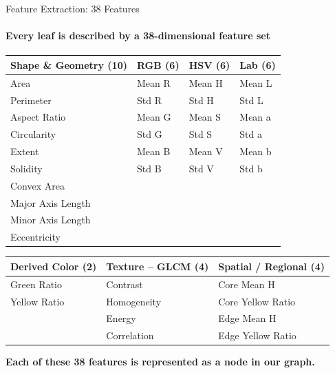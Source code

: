 \documentclass[aspectratio=169, 11pt]{beamer}
\begin{document}
\begin{frame}{Feature Extraction: 38 Features}
    \framesubtitle{Every leaf is described by a 38-dimensional feature set}

    \tiny
    \renewcommand{\arraystretch}{1.15}
    \begin{center}
    \begin{tabular}{@{}p{2.7cm}p{2.6cm}p{2.4cm}p{2.4cm}@{}}
        \toprule
        \textbf{Shape \& Geometry (10)} & \textbf{RGB (6)} & \textbf{HSV (6)} & \textbf{Lab (6)} \\
        \midrule
        Area & Mean R & Mean H & Mean L \\
        Perimeter & Std R & Std H & Std L \\
        Aspect Ratio & Mean G & Mean S & Mean a \\
        Circularity & Std G & Std S & Std a \\
        Extent & Mean B & Mean V & Mean b \\
        Solidity & Std B & Std V & Std b \\
        Convex Area & & & \\
        Major Axis Length & & & \\
        Minor Axis Length & & & \\
        Eccentricity & & & \\
        \bottomrule
    \end{tabular}

    \vspace{0.15cm}
    \begin{tabular}{@{}p{2.9cm}p{3.4cm}p{3.4cm}@{}}
        \toprule
        \textbf{Derived Color (2)} & \textbf{Texture -- GLCM \cite{haralick1973textural} (4)} & \textbf{Spatial / Regional (4)} \\
        \midrule
        Green Ratio & Contrast & Core Mean H \\
        Yellow Ratio & Homogeneity & Core Yellow Ratio \\
        & Energy & Edge Mean H \\
        & Correlation & Edge Yellow Ratio \\
        \bottomrule
    \end{tabular}
    \end{center}

    \vspace{0.15cm}
    \normalsize
    \begin{center}
    {\footnotesize\bfseries Each of these 38 features is represented as a
    node in our graph.}
    \end{center}
\end{frame}
\end{document}
